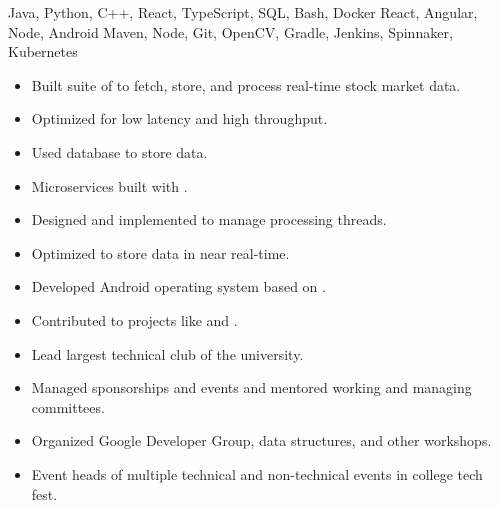  Java, Python, C++, React, TypeScript, SQL, Bash, Docker\newline
{} React, Angular, Node, Android\newline
{} Maven, Node, Git, OpenCV, Gradle, Jenkins, Spinnaker, Kubernetes\newline


\begin{itemize}
  \item Built  suite of  to fetch, store, and process real-time stock market data.
  \item Optimized for low latency and high throughput.
  \item Used  database to store data.
  \item Microservices built with .
  \item Designed and implemented  to manage processing threads.
  \item Optimized to store data in near real-time.
 \end{itemize}

\begin{itemize}
  \item Developed Android operating system based on .
  \item Contributed to  projects like  and .
 \end{itemize}


\begin{itemize}
    \item Lead largest technical club of the university.
    \item Managed sponsorships and events and mentored working and managing committees.
    \item Organized Google Developer Group, data structures, and other workshops.
 \end{itemize}
\begin{itemize}
    \item Event heads of multiple technical and non-technical events in college tech fest.
 \end{itemize}

